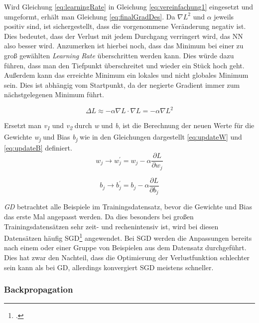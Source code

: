 Wird Gleichung \ref{eq:learningRate} in Gleichung \ref{eq:vereinfachung1} eingesetzt und umgeformt, erhält man Gleichung \ref{eq:finalGradDes}. Da  $\nabla L^2$ und $\alpha$ jeweils positiv sind, ist sichergestellt, dass die vorgenommene Veränderung negativ ist. Dies bedeutet, dass der Verlust mit jedem Durchgang verringert wird, das \ac{NN} also besser wird. Anzumerken ist hierbei noch, dass das Minimum bei einer zu groß gewählten \textit{Learning Rate} überschritten werden kann. Dies würde dazu führen, dass man den Tiefpunkt überschreitet und wieder ein Stück hoch geht. Außerdem kann das erreichte Minimum ein lokales und nicht globales Minimum sein. Dies ist abhängig vom Startpunkt, da der negierte Gradient immer zum nächstgelegenen Minimum führt.

\begin{equation} \label{eq:finalGradDes}
    \Delta L \approx -\alpha \nabla L \cdot  \nabla L =  -\alpha \nabla L^2
\end{equation}

Ersetzt man \textit{v\textsubscript{1}} und \textit{v\textsubscript{2}} durch \textit{w} und \textit{b}, ist die Berechnung der neuen Werte für die Gewichte \textit{w\textsubscript{j}} und Bias \textit{b\textsubscript{j}} wie in den Gleichungen dargestellt \ref{eq:updateW} und \ref{eq:updateB} definiert.
\begin{equation} \label{eq:updateW}
    w_{j} \rightarrow w_{j}^{'} = w_{j} - \alpha \frac{\partial L}{\partial w_{j}}
\end{equation}

\begin{equation} \label{eq:updateB}
    b_{j} \rightarrow b_{j}^{'} = b_{j} - \alpha \frac{\partial L}{\partial b_{j}}
\end{equation}

\textit{\ac{GD}} betrachtet alle Beispiele im Trainingsdatensatz, bevor die Gewichte und Bias das erste Mal angepasst werden. Da dies  besonders bei großen Trainingsdatensätzen sehr zeit- und rechenintensiv ist, wird bei diesen Datensätzen häufig \ac{SGD}\footcite[Vgl. ][S. 400 ff.]{robbinsStochasticApproximationMethod1951}  angewendet. Bei \ac{SGD} werden die Anpassungen bereits nach einem oder einer Gruppe von Beispielen aus dem Datensatz durchgeführt. Dies hat zwar den Nachteil, dass die Optimierung der Verlustfunktion schlechter sein kann als bei \ac{GD}, allerdings konvergiert \ac{SGD} meistens schneller.

\subsubsection{Backpropagation}

